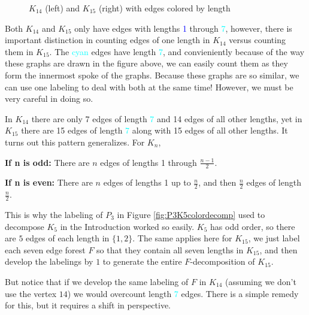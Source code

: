 \begin{figure}[H]
\begin{center}
\begin{tikzpicture}[scale=2]
            
    \end{tikzpicture}
    \end{center}
\caption{$K_{14}$ (left) and $K_{15}$ (right) with edges colored by length}
\label{fig:K14K15colored}
\end{figure}

Both $K_{14}$ and $K_{15}$ only have edges with lengths \textcolor{blue}{1} through \textcolor{cyan}{7}, however, there is important distinction in counting edges of one length in $K_{14}$ versus counting them in $K_{15}$. The \textcolor{cyan}{cyan} edges have length \textcolor{cyan}{7}, and convieniently because of the way these graphs are drawn in the figure above, we can easily count them as they form the innermost spoke of the graphs. Because these graphs are so similar, we can use one labeling to deal with both at the same time! However, we must be very careful in doing so.

In $K_{14}$ there are only 7 edges of length \textcolor{cyan}{7} and 14 edges of all other lengths, yet in $K_{15}$ there are 15 edges of length \textcolor{cyan}{7} along with 15 edges of all other lengths. It turns out this pattern generalizes. For $K_{n}$,

\textbf{If n is odd:} There are $n$ edges of lengths 1 through $\frac{n-1}{2}$.

\textbf{If n is even:} There are $n$ edges of lengths 1 up to $\frac{n}{2}$, and then $\frac{n}{2}$ edges of length $\frac{n}{2}.$

\noindent This is why the labeling of $P_{3}$ in Figure \ref{fig:P3K5colordecomp} used to decompose $K_{5}$ in the Introduction worked so easily. $K_{5}$ has odd order, so there are $5$ edges of each length in $\{1,2\}$. The same applies here for $K_{15}$, we just label each seven edge forest $F$ so that they contain all seven lengths in $K_{15}$, and then develop the labelings by $1$ to generate the entire $F$-decomposition of $K_{15}$. 

But notice that if we develop the same labeling of $F$ in $K_{14}$ (assuming we don't use the vertex $14$) we would overcount length \textcolor{cyan}{7} edges. There is a simple remedy for this, but it requires a shift in perspective.

